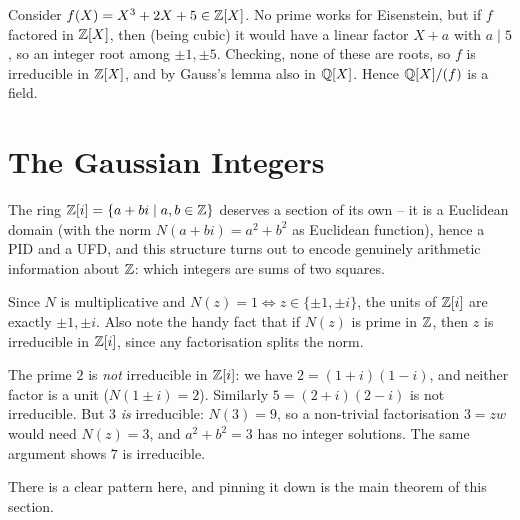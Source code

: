 \documentclass[a4paper]{scrartcl}
\begin{document}
\begin{example}
	Consider $f(X) = X^3 + 2X + 5 \in \mathbb{Z}[X]$. No prime works for Eisenstein, but if $f$ factored in $\mathbb{Z}[X]$, then (being cubic) it would have a linear factor $X + a$ with $a \mid 5$, so an integer root among $\pm 1, \pm 5$. Checking, none of these are roots, so $f$ is irreducible in $\mathbb{Z}[X]$, and by Gauss's lemma also in $\mathbb{Q}[X]$. Hence $\mathbb{Q}[X]/(f)$ is a field.
\end{example}

\section{The Gaussian Integers}

The ring $\mathbb{Z}[i] = \{a + bi \mid a, b \in \mathbb{Z}\}$ deserves a section of its own -- it is a Euclidean domain (with the norm $N(a + bi) = a^2 + b^2$ as Euclidean function), hence a PID and a UFD, and this structure turns out to encode genuinely arithmetic information about $\mathbb{Z}$: which integers are sums of two squares.

Since $N$ is multiplicative and $N(z) = 1 \iff z \in \{\pm 1, \pm i\}$, the units of $\mathbb{Z}[i]$ are exactly $\pm 1, \pm i$. Also note the handy fact that if $N(z)$ is prime in $\mathbb{Z}$, then $z$ is irreducible in $\mathbb{Z}[i]$, since any factorisation splits the norm.

\begin{example}
	The prime $2$ is \emph{not} irreducible in $\mathbb{Z}[i]$: we have $2 = (1 + i)(1 - i)$, and neither factor is a unit ($N(1 \pm i) = 2$). Similarly $5 = (2 + i)(2 - i)$ is not irreducible. But $3$ \emph{is} irreducible: $N(3) = 9$, so a non-trivial factorisation $3 = zw$ would need $N(z) = 3$, and $a^2 + b^2 = 3$ has no integer solutions. The same argument shows $7$ is irreducible.
\end{example}

There is a clear pattern here, and pinning it down is the main theorem of this section.
\end{document}
